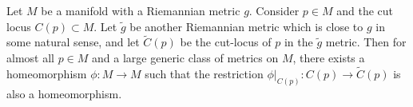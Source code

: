 Let $M$ be a manifold with a Riemannian metric $g$. Consider $p \in M$ and the cut locus $C(p) \subset M$. Let $\tilde{g}$ be another Riemannian metric which is close to $g$ in some natural sense, and let $\tilde{C}(p)$ be the cut-locus of $p$ in the $\tilde{g}$ metric. Then for almost all $p \in M$ and a large generic class of metrics on $M$, there exists a homeomorphism $\phi: M \to M$ such that the restriction $\phi|_{C(p)}: C(p) \to \tilde{C}(p)$ is also a homeomorphism.
